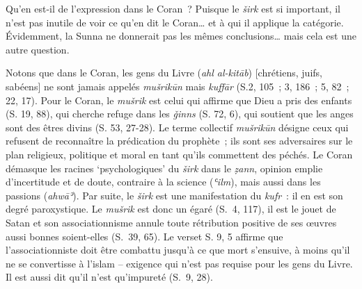 Qu'en est-il de l'expression dans le Coran~? Puisque le \emph{širk} est
si important, il n'est pas inutile de voir ce qu'en dit le Coran\ldots{}
et à qui il applique la catégorie. Évidemment, la Sunna ne donnerait pas
les mêmes conclusions\ldots{} mais cela est une autre question.

Notons que dans le Coran, les gens du Livre (\emph{ahl al-kitāb})
{[}chrétiens, juifs, sabéens{]} ne sont jamais appelés \emph{mušrikūn}
mais \emph{kuffār} (S.2, 105~; 3, 186~; 5, 82~; 22, 17). Pour le Coran, le \emph{mušrik} est celui
qui affirme que Dieu a pris des enfants (S. 19, 88), qui cherche refuge
dans les \emph{ǧinns} (S. 72, 6), qui soutient que les anges sont des
êtres divins (S. 53, 27-28). Le terme collectif \emph{mušrikūn} désigne
ceux qui refusent de reconnaître la prédication du prophète~; ils sont
ses adversaires sur le plan religieux, politique et moral en tant qu'ils
commettent des péchés. Le Coran démasque les racines `psychologiques' du
\emph{širk} dans le \emph{ẓann}, opinion emplie d'incertitude et de
doute, contraire à la science (\emph{ʿilm}),
mais aussi dans les passions (\emph{ahwāʾ}). Par suite, le \emph{širk}
est une manifestation du \emph{kufr}~: il en est son degré paroxystique.
Le \emph{mušrik} est donc un égaré (S.~4, 117), il est le jouet de Satan
et son associationnisme annule toute rétribution positive de ses œuvres
aussi bonnes soient-elles (S.~39, 65). Le
verset S. 9, 5 affirme que l'associationniste doit être combattu jusqu'à
ce que mort s'ensuive, à moins qu'il ne se convertisse à l'islam --
exigence qui n'est pas requise pour les gens du Livre. Il est aussi dit
qu'il n'est qu'impureté (S.~9, 28).


